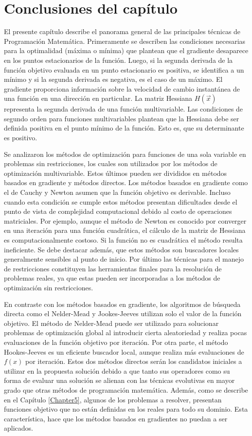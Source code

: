 \section{Conclusiones del capítulo}
El presente capítulo describe el panorama general de las principales técnicas de Programación Matemática. Primeramente se describen las condiciones necesarias para la optimalidad (máxima o mínima) que plantean que el gradiente desaparece en los puntos estacionarios de la función. Luego, si la segunda derivada de la función objetivo evaluada en un punto estacionario es positiva, se identifica a un mínimo y si la segunda derivada es negativa, es el caso de un máximo. El gradiente proporciona información sobre la velocidad de cambio instantánea de una función en una dirección en particular. La matriz Hessiana $H(\vec{x})$ representa la segunda derivada de una función multivariable. Las condiciones de segundo orden para funciones multivariables plantean que la Hessiana debe ser definida positiva en el punto mínimo de la función. Esto es, que su determinante es positivo.

Se analizaron los métodos de optimización para funciones de una sola variable en problemas sin restricciones, los cuales son utilizados por los métodos de optimización multivariable. Estos últimos pueden ser divididos en métodos basados en gradiente y métodos directos. Los métodos basados en gradiente como el de Cauchy y Newton asumen que la función objetivo es derivable. Incluso cuando esta condición se cumple estos métodos presentan dificultades desde el punto de vista de complejidad computacional debido al costo de operaciones matriciales. Por ejemplo, aunque el método de Newton es conocido por converger en una iteración para una función cuadrática, el cálculo de la matriz de Hessiana es computacionalmente costoso. Si la función no es cuadrática el método resulta ineficiente. Se debe destacar además, que estos métodos son buscadores locales generalmente sensibles al punto de inicio. Por último las técnicas para el manejo de restricciones constituyen las herramientas finales para la resolución de problemas reales,  ya que estas pueden ser incorporadas a los métodos de optimización sin restricciones.

En contraste con los métodos basados en gradiente, los algoritmos de búsqueda directa como el Nelder-Mead y Jookes-Jeeves utilizan solo el valor de la función objetivo. El método de Nelder-Mead puede ser utilizado para solucionar problemas de optimización global al introducir cierta aleatoriedad \cite{belegundu_optimization_2011} y realiza pocas evaluaciones de la función objetivo por iteración. Por otra parte, el método Hookes-Jeeves es un eficiente buscador local, aunque realiza más evaluaciones de $f(x)$ por iteración. Estos dos métodos directos serán los candidatos iniciales a utilizar en la propuesta solución debido a que tanto sus operadores como su forma de evaluar una solución se alienan con las técnicas evolutivas en mayor grado que otras métodos de programación matemática. Además, como se describe en el Capítulo \ref{Chapter5}, algunos de los problemas a resolver, presentan funciones objetivo que no están definidas en los reales para todo su dominio. Esta característica, hace que los métodos basados en gradientes no puedan a ser aplicados.